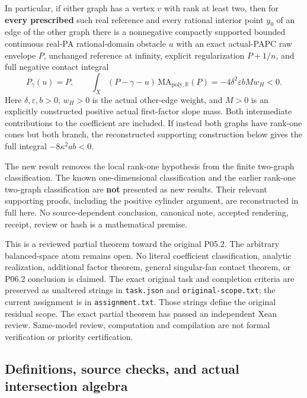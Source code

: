 \documentclass[
  11pt,
]{article}
\begin{document}
In particular, if either graph has a vertex \(v\) with rank at least
two, then for \textbf{every prescribed} such real reference and every
rational interior point \(y_0\) of an edge of the other graph there is a
nonnegative compactly supported bounded continuous real-PA
rational-domain obstacle \(u\) with an exact actual-PAPC raw envelope
\(P\), unchanged reference at infinity, explicit regularization
\(P+1/n\), and full negative contact integral \[
 P_\gamma(u)=P,\qquad
 \int_X(P-\gamma-u)\,\mathrm{MA}_{\mathrm{poly},\mathbb{R}}(P)
       =-4\delta^2\varepsilon b M w_H<0.                       \tag{HR0}
\] Here \(\delta,\varepsilon,b>0\), \(w_H>0\) is the actual other-edge
weight, and \(M>0\) is an explicitly constructed positive actual
first-factor slope mass. Both intermediate contributions to the
coefficient are included. If instead both graphs have rank-one cones but
both branch, the reconstructed supporting construction below gives the
full integral \(-8\kappa^2ab<0\).

The new result removes the local rank-one hypothesis from the finite
two-graph classification. The known one-dimensional classification and
the earlier rank-one two-graph classification are \textbf{not} presented
as new results. Their relevant supporting proofs, including the positive
cylinder argument, are reconstructed in full here. No source-dependent
conclusion, canonical note, accepted rendering, receipt, review or hash
is a mathematical premise.

This is a reviewed partial theorem toward the original P05.2. The arbitrary
balanced-space atom remains open. No literal coefficient classification,
analytic realization, additional factor theorem, general singular-fan
contact theorem, or P06.2 conclusion is claimed. The exact original task
and completion criteria are preserved as unaltered strings in
\texttt{task.json} and \texttt{original-scope.txt}; the current
assignment is in \texttt{assignment.txt}. Those strings define the
original residual scope. The exact partial theorem has passed an independent Xean review.
Same-model review, computation and compilation are not formal
verification or priority certification.

\subsection{Definitions, source checks, and actual intersection
algebra}\label{definitions-source-checks-and-actual-intersection-algebra}
\end{document}
